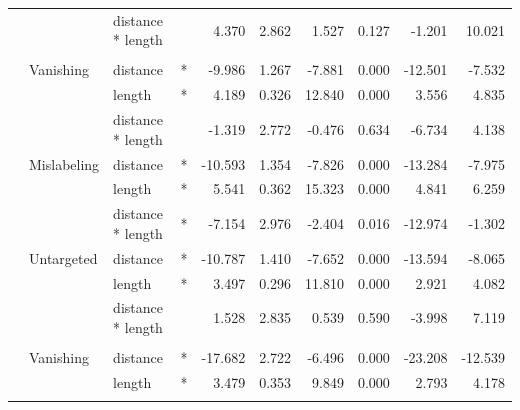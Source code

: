 \begin{longtable}[t]{llllrrrrrr}
\cmidrule{3-10}\nopagebreak
\hspace{1em} &  & distance * length &  & 4.370 & 2.862 & 1.527 & 0.127 & -1.201 & 10.021\\
\cmidrule{1-10}\pagebreak[0]
\addlinespace[0.3em]
\multicolumn{10}{l}{\textbf{SSD}}\\
\hspace{1em} & Vanishing & distance & * & -9.986 & 1.267 & -7.881 & 0.000 & -12.501 & -7.532\\
\cmidrule{3-10}\nopagebreak
\hspace{1em} &  & length & * & 4.189 & 0.326 & 12.840 & 0.000 & 3.556 & 4.835\\
\cmidrule{3-10}\nopagebreak
\hspace{1em} &  & distance * length &  & -1.319 & 2.772 & -0.476 & 0.634 & -6.734 & 4.138\\
\cmidrule{2-10}\nopagebreak
\hspace{1em} & Mislabeling & distance & * & -10.593 & 1.354 & -7.826 & 0.000 & -13.284 & -7.975\\
\cmidrule{3-10}\nopagebreak
\hspace{1em} &  & length & * & 5.541 & 0.362 & 15.323 & 0.000 & 4.841 & 6.259\\
\cmidrule{3-10}\nopagebreak
\hspace{1em} &  & distance * length & * & -7.154 & 2.976 & -2.404 & 0.016 & -12.974 & -1.302\\
\cmidrule{2-10}\nopagebreak
\hspace{1em} & Untargeted & distance & * & -10.787 & 1.410 & -7.652 & 0.000 & -13.594 & -8.065\\
\cmidrule{3-10}\nopagebreak
\hspace{1em} &  & length & * & 3.497 & 0.296 & 11.810 & 0.000 & 2.921 & 4.082\\
\cmidrule{3-10}\nopagebreak
\hspace{1em} &  & distance * length &  & 1.528 & 2.835 & 0.539 & 0.590 & -3.998 & 7.119\\
\cmidrule{1-10}\pagebreak[0]
\addlinespace[0.3em]
\multicolumn{10}{l}{\textbf{RetinaNet}}\\
\hspace{1em} & Vanishing & distance & * & -17.682 & 2.722 & -6.496 & 0.000 & -23.208 & -12.539\\
\cmidrule{3-10}\nopagebreak
\hspace{1em} &  & length & * & 3.479 & 0.353 & 9.849 & 0.000 & 2.793 & 4.178\\
\cmidrule{3-10}\nopagebreak

\end{longtable}
